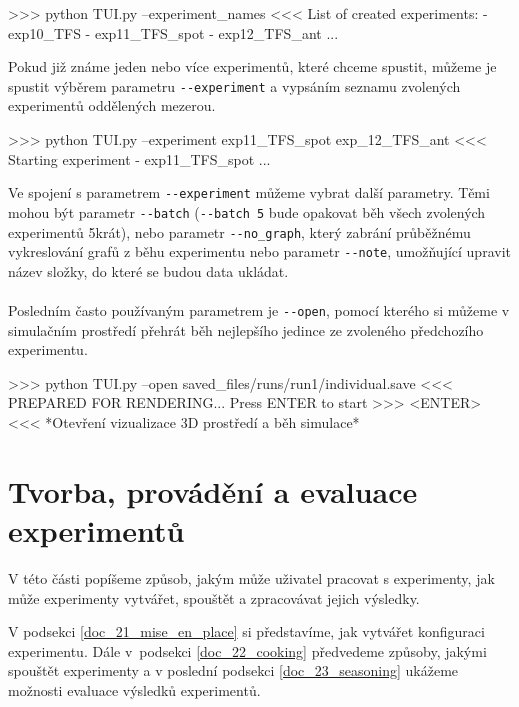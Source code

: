 \begin{code}
>>> python TUI.py --experiment_names
<<< List of created experiments:
     - exp10_TFS
     - exp11_TFS_spot
     - exp12_TFS_ant
     ...
\end{code}

Pokud již známe jeden nebo více experimentů, které chceme spustit,
můžeme je spustit výběrem parametru \texttt{-{}-experiment} a vypsáním seznamu 
zvolených experimentů oddělených mezerou.

\begin{code}
>>> python TUI.py --experiment exp11_TFS_spot exp_12_TFS_ant
<<< Starting experiment - exp11_TFS_spot 
    ...
\end{code}

Ve spojení s parametrem \texttt{-{}-experiment} můžeme vybrat další parametry.
Těmi mohou být parametr \texttt{-{}-batch} (\texttt{-{}-batch 5} bude
opakovat běh všech zvolených experimentů 5krát), nebo parametr
\texttt{-{}-no\_graph}, který zabrání průběžnému vykreslování grafů z běhu
experimentu nebo parametr \texttt{-{}-note}, umožňující upravit název složky,
do které se budou data ukládat.

\paragraph{}
Posledním často používaným parametrem je \texttt{-{}-open}, pomocí kterého
si můžeme v simulačním prostředí přehrát běh nejlepšího jedince ze zvoleného
předchozího experimentu.
\begin{code}
>>> python TUI.py --open saved_files/runs/run1/individual.save
<<< PREPARED FOR RENDERING... Press ENTER to start
>>> <ENTER>
<<< *Otevření vizualizace 3D prostředí a běh simulace*
\end{code}

\section{Tvorba, provádění a evaluace experimentů} \label{doc_2_experimenty}

V této části popíšeme způsob, jakým může uživatel pracovat s experimenty, jak
může experimenty vytvářet, spouštět a zpracovávat jejich výsledky.

V podsekci \ref{doc_21_mise_en_place} si představíme, jak vytvářet
konfiguraci experimentu. Dále v~podsekci \ref{doc_22_cooking} předvedeme
způsoby, jakými spouštět experimenty a v poslední podsekci
\ref{doc_23_seasoning} ukážeme možnosti evaluace výsledků experimentů.

